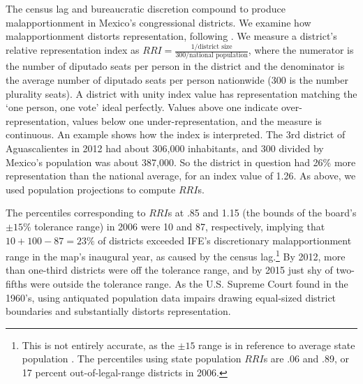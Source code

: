 \documentclass[letter,12pt]{article}
\begin{document}
The census lag and bureaucratic discretion compound to produce malapportionment in Mexico's congressional districts. We examine how malapportionment distorts representation, following \citet{ansolabehere.gerber.snyderCourtRedis2002}. We measure a district's relative representation index as $RRI = \frac{1/\text{district size}}{300/\text{national population}}$, where the numerator is the number of diputado seats per person in the district and the denominator is the average number of diputado seats per person nationwide (300 is the number plurality seats). A district with unity index value has representation matching the `one person, one vote' ideal perfectly. Values above one indicate over-representation, values below one under-representation, and the measure is continuous. An example shows how the index is interpreted. The 3rd district of Aguascalientes in 2012 had about 306,000 inhabitants, and 300 divided by Mexico's population was about 387,000. So the district in question had 26\% more representation than the national average, for an index value of 1.26. As above, we used population projections to compute $RRI$s.

The percentiles corresponding to $RRI$s at .85 and 1.15 (the bounds of the board's $\pm15\%$ tolerance range) in 2006 were 10 and 87, respectively, implying that $10+100-87=23\%$ of districts exceeded IFE's discretionary malapportionment range in the map's inaugural year, as caused by the census lag.\footnote{This is not entirely accurate, as the $\pm15$ range is in reference to average state population \citep[not average national population, analyzed here, see][]{altman.magar.mcd.trelles2014apsa}. The percentiles using state population $RRI$s are .06 and .89, or 17 percent out-of-legal-range districts in 2006.} By 2012, more than one-third districts were off the tolerance range, and by 2015 just shy of two-fifths were outside the tolerance range. As the U.S. Supreme Court found in the 1960's, using antiquated population data impairs drawing equal-sized district boundaries and substantially distorts representation. 
\end{document}
